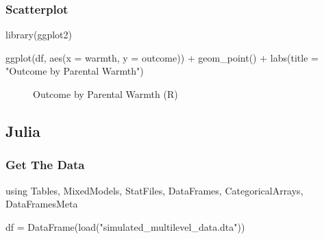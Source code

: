 \documentclass[
  letterpaper,
  DIV=11,
  numbers=noendperiod]{scrreprt}
\newenvironment{Shaded}{\begin{snugshade}}{\end{snugshade}}
\newcommand{\AttributeTok}[1]{\textcolor[rgb]{0.40,0.45,0.13}{#1}}
\newcommand{\BuiltInTok}[1]{\textcolor[rgb]{0.00,0.23,0.31}{#1}}
\newcommand{\FunctionTok}[1]{\textcolor[rgb]{0.28,0.35,0.67}{#1}}
\newcommand{\ImportTok}[1]{\textcolor[rgb]{0.00,0.46,0.62}{#1}}
\newcommand{\NormalTok}[1]{\textcolor[rgb]{0.00,0.23,0.31}{#1}}
\newcommand{\OperatorTok}[1]{\textcolor[rgb]{0.37,0.37,0.37}{#1}}
\newcommand{\SpecialCharTok}[1]{\textcolor[rgb]{0.37,0.37,0.37}{#1}}
\newcommand{\StringTok}[1]{\textcolor[rgb]{0.13,0.47,0.30}{#1}}
\begin{document}
\subsubsection{Scatterplot}\label{scatterplot-1}

\begin{Shaded}
\begin{Highlighting}[]
\FunctionTok{library}\NormalTok{(ggplot2)}

\FunctionTok{ggplot}\NormalTok{(df,}
       \FunctionTok{aes}\NormalTok{(}\AttributeTok{x =}\NormalTok{ warmth,}
           \AttributeTok{y =}\NormalTok{ outcome)) }\SpecialCharTok{+}
  \FunctionTok{geom\_point}\NormalTok{() }\SpecialCharTok{+}
  \FunctionTok{labs}\NormalTok{(}\AttributeTok{title =} \StringTok{"Outcome by Parental Warmth"}\NormalTok{)}
\end{Highlighting}
\end{Shaded}

\begin{figure}[H]


\caption{\label{fig-R}Outcome by Parental Warmth (R)}

\end{figure}%

\subsection{Julia}

\subsubsection{Get The Data}\label{get-the-data-2}

\begin{Shaded}
\begin{Highlighting}[]
\ImportTok{using} \BuiltInTok{Tables}\NormalTok{, }\BuiltInTok{MixedModels}\NormalTok{, }\BuiltInTok{StatFiles}\NormalTok{, }\BuiltInTok{DataFrames}\NormalTok{, }\BuiltInTok{CategoricalArrays}\NormalTok{, }\BuiltInTok{DataFramesMeta}

\NormalTok{df }\OperatorTok{=} \FunctionTok{DataFrame}\NormalTok{(}\FunctionTok{load}\NormalTok{(}\StringTok{"simulated\_multilevel\_data.dta"}\NormalTok{))}
\end{Highlighting}
\end{Shaded}
\end{document}
